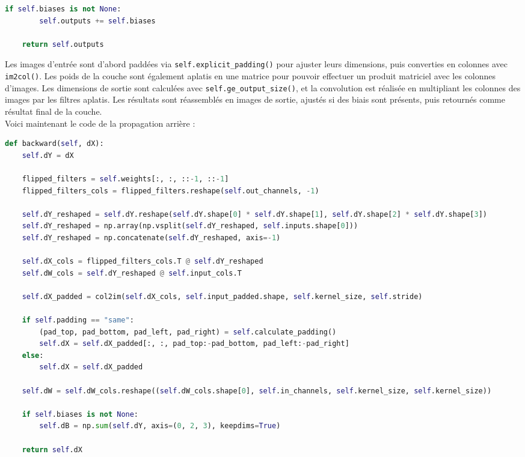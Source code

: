\begin{multicols}{2}
\begin{lstlisting}[language=Python]
    if self.biases is not None:
        self.outputs += self.biases

    return self.outputs
\end{lstlisting}
\hfill\break

Les images d’entrée sont d’abord paddées via \texttt{self.explicit\_padding()} pour ajuster leurs dimensions, 
puis converties en colonnes avec \texttt{im2col()}. Les poids de la couche sont également aplatis en une 
matrice pour pouvoir effectuer un produit matriciel avec les colonnes d’images. Les dimensions de sortie sont 
calculées avec \texttt{self.ge\_output\_size()}, et la convolution est réalisée en multipliant les colonnes des images 
par les filtres aplatis. Les résultats sont réassemblés en images de sortie, ajustés si des biais sont 
présents, puis retournés comme résultat final de la couche.\\

Voici maintenant le code de la propagation arrière : \\

\begin{lstlisting}[language=Python]
def backward(self, dX):
    self.dY = dX

    flipped_filters = self.weights[:, :, ::-1, ::-1]
    flipped_filters_cols = flipped_filters.reshape(self.out_channels, -1)

    self.dY_reshaped = self.dY.reshape(self.dY.shape[0] * self.dY.shape[1], self.dY.shape[2] * self.dY.shape[3])
    self.dY_reshaped = np.array(np.vsplit(self.dY_reshaped, self.inputs.shape[0]))
    self.dY_reshaped = np.concatenate(self.dY_reshaped, axis=-1)

    self.dX_cols = flipped_filters_cols.T @ self.dY_reshaped
    self.dW_cols = self.dY_reshaped @ self.input_cols.T

    self.dX_padded = col2im(self.dX_cols, self.input_padded.shape, self.kernel_size, self.stride)

    if self.padding == "same":
        (pad_top, pad_bottom, pad_left, pad_right) = self.calculate_padding()
        self.dX = self.dX_padded[:, :, pad_top:-pad_bottom, pad_left:-pad_right]
    else:
        self.dX = self.dX_padded

    self.dW = self.dW_cols.reshape((self.dW_cols.shape[0], self.in_channels, self.kernel_size, self.kernel_size))

    if self.biases is not None:
        self.dB = np.sum(self.dY, axis=(0, 2, 3), keepdims=True)

    return self.dX
\end{lstlisting}
\hfill\break


\end{multicols}
